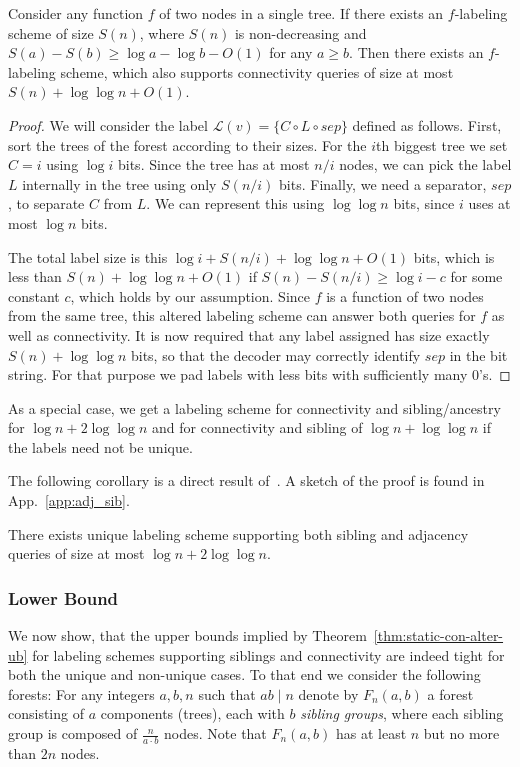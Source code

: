\documentclass{llncs}
\newcommand{\la}{\ensuremath{ \mathcal{L}}}
\begin{document}
\begin{theorem}\label{thm:static-con-alter-ub}
    Consider any function $f$ of two nodes in a single tree. If there exists an
    $f$-labeling scheme of size $S(n)$, where $S(n)$ is non-decreasing and
    $S(a) - S(b) \ge \log a - \log b - O(1)$ for any $a\ge b$.
    Then there exists an $f$-labeling scheme, which also supports connectivity
    queries of size at most $S(n) + \log\log n + O(1)$.
\end{theorem}
\begin{proof}
    We will consider the label $\la(v) = \{C\circ L\circ sep\}$ defined as
    follows. First, sort the trees of the forest according to their sizes. For the $i$th biggest tree we set $C = i$ using $\log i$ bits. Since the tree has at most $n/i$ nodes, we can pick the label $L$ internally in the tree using only $S(n/i)$ bits. Finally, we need a separator, $sep$, to separate $C$ from $L$. We can represent this using $\log\log n$ bits, since $i$ uses at most $\log n$ bits.

    The total label size is this $\log i + S(n/i) + \log\log n + O(1)$ bits, which is less than
    $S(n) + \log\log n + O(1)$ if $S(n) - S(n/i) \ge \log i - c$ for some
    constant $c$, which holds by our assumption. Since $f$ is a function of two nodes from
    the same tree, this altered labeling scheme can answer both queries for $f$
    as well as connectivity. It is now required that any label assigned has size exactly $S(n) + \log\log n$ bits, so that the decoder may correctly identify $sep$ in the bit string. For that purpose we  pad labels with less bits with sufficiently many $0$'s.
\end{proof}

As a special case, we get a labeling scheme for connectivity and
sibling/ancestry for $\log n + 2\log\log n$ and for connectivity and sibling of
$\log n + \log\log n$ if the labels need not be unique.

The following corollary is a direct result of~\cite{Alstrup02,Alstrup05}. A
sketch of the proof is found in App.~\ref{app:adj_sib}.
\begin{corollary}\label{cor:adj_sib_static}
There exists unique labeling scheme supporting both sibling and adjacency  queries of size at most $\log n + 2 \log \log n$.
\end{corollary}

\subsubsection{Lower Bound}
We now show, that the upper bounds implied  by Theorem~\ref{thm:static-con-alter-ub} for labeling schemes supporting siblings and connectivity  are indeed tight for both the unique and non-unique  cases.
To that end we consider the following forests: For any integers $a,b,n$ such that $ab \mid n$
denote by $F_n(a,b)$ a forest consisting of $a$
components (trees), each with $b$ \emph{sibling groups}, where each sibling
group is composed of $\frac{n}{a\cdot b}$ nodes. Note that $F_n(a,b)$ has at least
$n$ but no more than $2n$ nodes.
\end{document}
